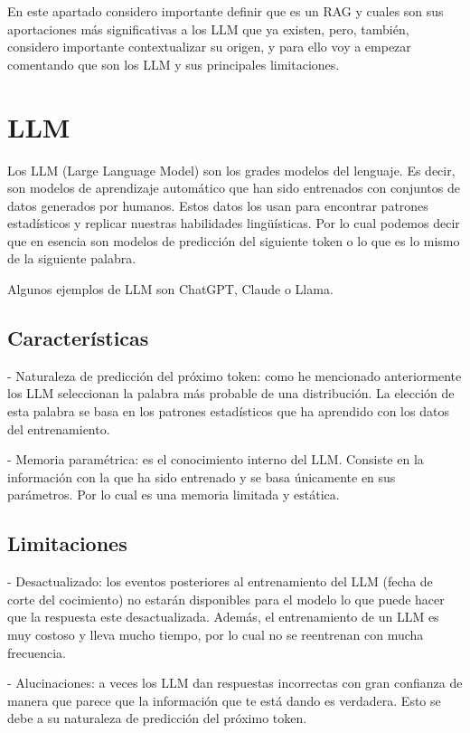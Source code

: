 
En este apartado considero importante definir que es un RAG y cuales son sus aportaciones más significativas a los LLM que ya existen, pero, también, considero importante contextualizar su origen, y para ello voy a empezar comentando que son los LLM y sus principales limitaciones. 

\section{LLM}
Los LLM (Large Language Model) son los grades modelos del lenguaje. Es decir, son modelos de aprendizaje automático que han sido entrenados con conjuntos de datos generados por humanos. Estos datos los usan para encontrar patrones estadísticos y replicar nuestras habilidades lingüísticas. Por lo cual podemos decir que en esencia son modelos de predicción del siguiente token o lo que es lo mismo de la siguiente palabra.

Algunos ejemplos de LLM son ChatGPT, Claude o Llama.

\subsection{Características}

- Naturaleza de predicción del próximo token: como he mencionado anteriormente los LLM seleccionan la palabra más probable de una distribución. La elección de esta palabra se basa en los patrones estadísticos que ha aprendido con los datos del entrenamiento.

- Memoria paramétrica: es el conocimiento interno del LLM. Consiste en la información con la que ha sido entrenado y se basa únicamente en sus parámetros. Por lo cual es una memoria limitada y estática.

\subsection{Limitaciones}

- Desactualizado: los eventos posteriores al entrenamiento del LLM (fecha de corte del cocimiento) no estarán disponibles para el modelo lo que puede hacer que la respuesta este desactualizada. Además, el entrenamiento de un LLM es muy costoso y lleva mucho tiempo, por lo cual no se reentrenan con mucha frecuencia. 

- Alucinaciones: a veces los LLM dan respuestas incorrectas con gran confianza de manera que parece que la información que te está dando es verdadera. Esto se debe a su naturaleza de predicción del próximo token. 

